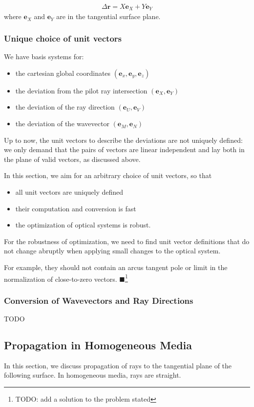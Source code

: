 \documentclass[12pt,a4paper,twoside,openright,BCOR10mm,headsepline,titlepage,abstracton,chapterprefix,final]{scrreprt}
\newcommand\Vector[1]{{\mathbf{#1}}}
\newcommand{\remark}[1]{{\color{red}$\blacksquare$}\footnote{{\color{red}#1}}}
\begin{document}
\begin{eqnarray}
 \Delta\Vector{r} = X \Vector{e}_{X} + Y \Vector{e}_{Y}
 \label{eq:deltaR_equals_XY}
\end{eqnarray}
where $\Vector{e}_{X}$ and $\Vector{e}_{Y}$ are in the tangential surface plane.


\subsubsection{Unique choice of unit vectors}
We have basis systems for:
\begin{itemize}
 \item the cartesian global coordinates $( \Vector{e}_x, \Vector{e}_y, \Vector{e}_z )$
 \item the deviation from the pilot ray intersection $( \Vector{e}_X, \Vector{e}_Y )$
 \item the deviation of the ray direction $( \Vector{e}_U, \Vector{e}_V )$
 \item the deviation of the wavevector $( \Vector{e}_M, \Vector{e}_N )$
\end{itemize}
Up to now, the unit vectors to describe the deviations are not uniquely defined: 
we only demand that the pairs of vectors are linear independent and lay both in the plane of valid vectors, as discussed above.

In this section, we aim for an arbitrary choice of unit vectors, so that
\begin{itemize}
 \item all unit vectors are uniquely defined
 \item their computation and conversion is fast 
 \item the optimization of optical systems is robust.
\end{itemize}
For the robustness of optimization, 
we need to find unit vector definitions that do not change abruptly 
when applying small changes to the optical system.



For example, they should not contain an arcus tangent pole or limit in the normalization of close-to-zero vectors.
\remark{TODO: add a solution to the problem stated}

\subsubsection{Conversion of Wavevectors and Ray Directions}
TODO


\subsection{Propagation in Homogeneous Media}
In this section, we discuss propagation of rays to the tangential plane of the following surface.
In homogeneous media, rays are straight.
\end{document}
